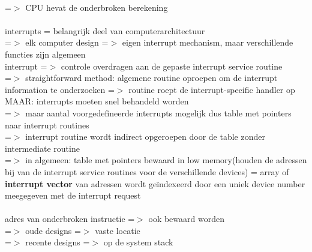 \documentclass{report}
\begin{document}
\\=$>$ CPU hevat de onderbroken berekening
\\
\\interrupts = belangrijk deel van computerarchitectuur
\\=$>$ elk computer design =$>$ eigen interrupt mechanism, maar verschillende functies zijn algemeen
\\interrupt =$>$ controle overdragen aan de gepaste interrupt service routine
\\ =$>$ straightforward method: algemene routine oproepen om de interrupt information te onderzoeken =$>$ routine roept de interrupt-specific handler op
\\ MAAR: interrupts moeten snel behandeld worden
\\=$>$ maar aantal voorgedefineerde interrupts mogelijk dus table met pointers naar interrupt routines
\\=$>$ interrupt routine wordt indirect opgeroepen door de table zonder intermediate routine
\\=$>$ in algemeen: table met pointers bewaard in low memory(houden de adressen bij van de interrupt service routines voor de verschillende devices) = array of \textbf{interrupt vector} van adressen wordt ge\"indexeerd door een uniek device number meegegeven met de interrupt request
\\
\\adres van onderbroken instructie =$>$ ook bewaard worden
\\=$>$ oude designs =$>$ vaste locatie
\\=$>$ recente designs =$>$ op de system stack
\end{document}

